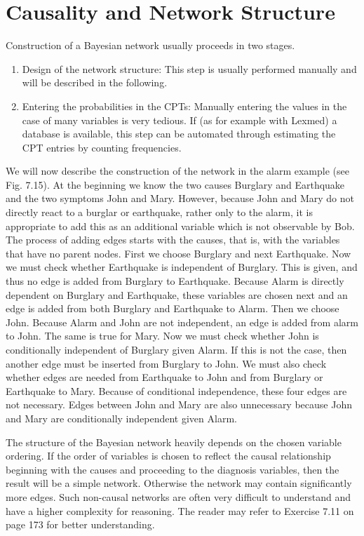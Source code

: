 \documentclass[10pt]{book}
\begin{document}
\section{Causality and Network Structure}
Construction of a Bayesian network usually proceeds in two stages.

\begin{enumerate}
  \item Design of the network structure: This step is usually performed manually and will be described in the following.
  \item Entering the probabilities in the CPTs: Manually entering the values in the case of many variables is very tedious. If (as for example with Lexmed) a database is available, this step can be automated through estimating the CPT entries by counting frequencies.
\end{enumerate}

We will now describe the construction of the network in the alarm example (see Fig. 7.15). At the beginning we know the two causes Burglary and Earthquake and the two symptoms John and Mary. However, because John and Mary do not directly react to a burglar or earthquake, rather only to the alarm, it is appropriate to add this as an additional variable which is not observable by Bob. The process of adding edges starts with the causes, that is, with the variables that have no parent nodes. First we choose Burglary and next Earthquake. Now we must check whether Earthquake is independent of Burglary. This is given, and thus no edge is added from Burglary to Earthquake. Because Alarm is directly dependent on Burglary and Earthquake, these variables are chosen next and an edge is added from both Burglary and Earthquake to Alarm. Then we choose John. Because Alarm and John are not independent, an edge is added from alarm to John. The same is true for Mary. Now we must check whether John is conditionally independent of Burglary given Alarm. If this is not the case, then another edge must be inserted from Burglary to John. We must also check whether edges are needed from Earthquake to John and from Burglary or Earthquake to Mary. Because of conditional independence, these four edges are not necessary. Edges between John and Mary are also unnecessary because John and Mary are conditionally independent given Alarm.

The structure of the Bayesian network heavily depends on the chosen variable ordering. If the order of variables is chosen to reflect the causal relationship beginning with the causes and proceeding to the diagnosis variables, then the result will be a simple network. Otherwise the network may contain significantly more edges. Such non-causal networks are often very difficult to understand and have a higher complexity for reasoning. The reader may refer to Exercise 7.11 on page 173 for better understanding.
\end{document}
